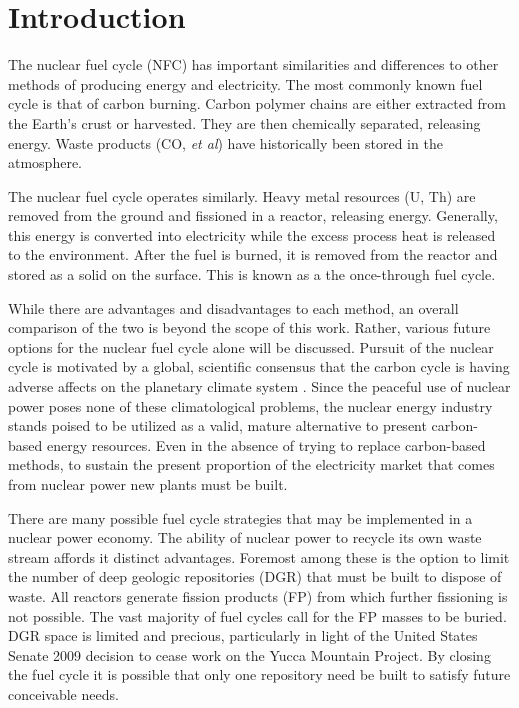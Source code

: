 \chapter{Introduction}
\label{diss_intro}

The nuclear fuel cycle (NFC) has important similarities and differences to other
methods of producing energy and electricity.  The most commonly known 
fuel cycle is that of carbon burning.  Carbon polymer chains
are either extracted from the Earth's crust or harvested. They are then chemically separated,
releasing energy.  Waste products (CO, \emph{et al}) have historically been 
stored in the atmosphere.

The nuclear fuel cycle operates similarly.  Heavy metal resources (U, Th) are removed from the ground
and fissioned in a reactor, releasing energy.  Generally, this energy is converted 
into electricity while the excess process heat is released to the environment.  
After the fuel is burned, it is removed from the reactor and stored as a solid on the surface.
This is known as a the once-through fuel cycle.

While there are advantages and disadvantages to each method, an overall comparison of the two is beyond the scope
of this work.  Rather, various future options for the nuclear fuel cycle alone will be discussed.  
Pursuit of the nuclear cycle is motivated by a global, scientific consensus that the carbon cycle 
is having adverse affects on the planetary climate system \cite{Bates2008}.  
Since the peaceful use of nuclear power 
poses none of these climatological problems, the nuclear energy industry stands poised to be utilized 
as a valid, mature alternative to present carbon-based energy resources.
Even in the absence of trying to replace carbon-based methods, 
to sustain the present proportion of the electricity market that comes from 
nuclear power new plants must be built.

There are many possible fuel cycle strategies that may be implemented in a nuclear power economy.
The ability of nuclear power to recycle its own waste stream affords it distinct advantages.  
Foremost among these is the option to limit the number of deep geologic repositories (DGR) 
that must be built to dispose of waste.   All reactors generate fission products (FP) from 
which further fissioning is not possible.  The vast majority of fuel cycles call for the FP masses 
to be buried.  DGR space is limited and precious, particularly in light of the United States Senate 2009
decision to cease work on the Yucca Mountain Project.  
By closing the fuel cycle it is possible  that only one repository need be built to satisfy 
future conceivable needs.

